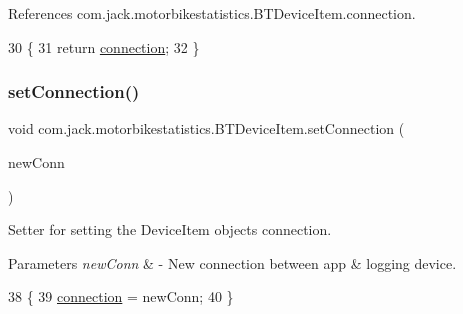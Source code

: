 References com.\+jack.\+motorbikestatistics.\+B\+T\+Device\+Item.\+connection.


\begin{DoxyCode}
30                                         \{
31         \textcolor{keywordflow}{return} \hyperlink{classcom_1_1jack_1_1motorbikestatistics_1_1_b_t_device_item_a38830528ad49afd7ba09ced7ab55d6dc}{connection};
32     \}
\end{DoxyCode}
\mbox{\label{classcom_1_1jack_1_1motorbikestatistics_1_1_b_t_device_item_a96f7261d9eab97d74569fbc3b0da4f28}} 
\subsubsection{\texorpdfstring{set\+Connection()}{setConnection()}}
{\footnotesize\ttfamily void com.\+jack.\+motorbikestatistics.\+B\+T\+Device\+Item.\+set\+Connection (\begin{DoxyParamCaption}\item[{\hyperlink{classcom_1_1jack_1_1motorbikestatistics_1_1_b_t_connection}{B\+T\+Connection}}]{new\+Conn }\end{DoxyParamCaption})\hspace{0.3cm}{\ttfamily [inline]}}



Setter for setting the Device\+Item object\textquotesingle{}s connection. 


\begin{DoxyParams}{Parameters}
{\em new\+Conn} & -\/ New connection between app \& logging device. \\
\hline
\end{DoxyParams}

\begin{DoxyCode}
38                                                     \{
39         \hyperlink{classcom_1_1jack_1_1motorbikestatistics_1_1_b_t_device_item_a38830528ad49afd7ba09ced7ab55d6dc}{connection} = newConn;
40     \}
\end{DoxyCode}
\mbox{\label{classcom_1_1jack_1_1motorbikestatistics_1_1_b_t_device_item_aab406fd517db729f7803d48546fd1a95}} 
